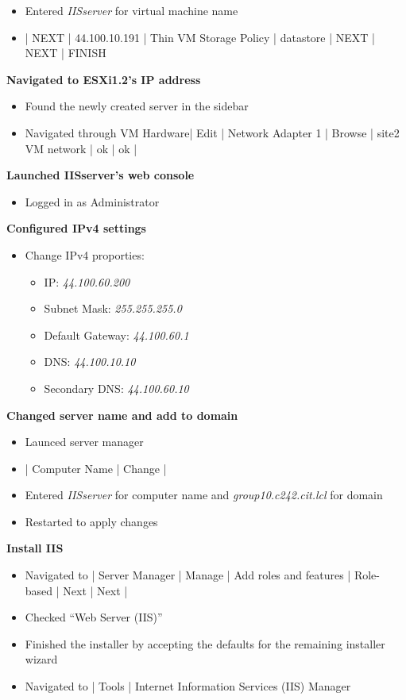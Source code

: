 \documentclass[letterpaper]{article}
\begin{document}
\begin{enumerate}
\begin{itemize}
\item Entered \emph{IISserver} for virtual machine name
\item | NEXT | 44.100.10.191 | Thin VM Storage Policy | datastore | NEXT | NEXT | FINISH
\end{itemize}
\textbf{Navigated to ESXi1.2's IP address}
\begin{itemize}
\item Found the newly created server in the sidebar
\item Navigated through VM Hardware| Edit | Network Adapter 1 | Browse | site2 VM network | ok | ok |
\end{itemize}
\textbf{Launched IISserver's web console}
\begin{itemize}
\item Logged in as Administrator
\end{itemize}
\textbf{Configured IPv4 settings}
\begin{itemize}
\item Change IPv4 proporties:
\begin{itemize}
\item IP: \emph{44.100.60.200}
\item Subnet Mask: \emph{255.255.255.0}
\item Default Gateway: \emph{44.100.60.1}
\item DNS: \emph{44.100.10.10}
\item Secondary DNS: \emph{44.100.60.10}
\end{itemize}
\end{itemize}
\textbf{Changed server name and add to domain}
\begin{itemize}
\item Launced server manager
\item | Computer Name | Change |
\item Entered \emph{IISserver} for computer name and \emph{group10.c242.cit.lcl} for domain
\item Restarted to apply changes
\end{itemize}
\textbf{Install IIS}
\begin{itemize}
\item Navigated to | Server Manager | Manage | Add roles and features | Role-based | Next | Next |
\item Checked ``Web Server (IIS)''
\item Finished the installer by accepting the defaults for the remaining installer wizard
\item Navigated to | Tools | Internet Information Services (IIS) Manager

\end{itemize}
\end{enumerate}
\end{document}
